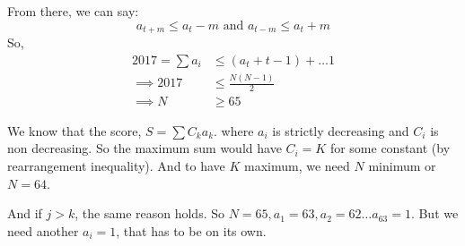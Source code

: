 \begin{solution}
			From there, we can say:
				\[a_{t+m}\le a_t-m\text{ and }a_{t-m}\le a_t+m\]
			So,
			\begin{align*}
				2017=\sum a_i &\le (a_t+t-1) +\dots 1 \\
				\implies 2017 &\le \frac{N(N-1)}{2}\\
				\implies N&\ge 65
			\end{align*}
			
			We know that the score, $ S= \sum C_ka_k $. where $ a_i $ is strictly decreasing and $ C_i $ is non decreasing. So the maximum sum would have $ C_i=K $ for some constant (by rearrangement inequality). And to have $ K $ maximum, we need $ N $ minimum or $ N=64 $. 
			
			And if $ j>k $, the same reason holds. So $ N=65, a_1=63, a_2=62\dots a_63=1 $. But we need another $ a_i=1 $, that has to be on its own. 
		\end{solution}